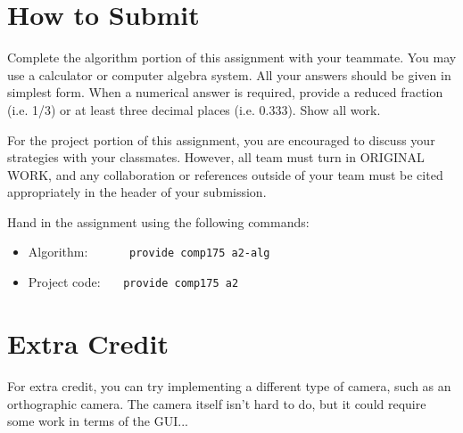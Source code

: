 \documentclass[10pt,twocolumn]{article}
\begin{document}
\section{How to Submit}					
Complete the algorithm portion of this assignment with your teammate. You may use a calculator or computer algebra system. All your answers should be given in simplest form. When a numerical answer is required, provide a reduced fraction (i.e. 1/3) or at least three decimal places (i.e. 0.333).  Show all work.


For the project portion of this assignment, you are encouraged to discuss your strategies with your classmates. However, all team must turn in ORIGINAL WORK, and any collaboration or references outside of your team must be cited appropriately in the header of your submission.

Hand in the assignment using the following commands:
\begin{itemize}
\item Algorithm:  \ \ \ \ \ \ {\tt provide comp175 a2-alg}
\item Project code: \ \ \ {\tt provide comp175 a2}
\end{itemize}


\section{Extra Credit}
For extra credit, you can try implementing a different type of camera, such as an orthographic camera. The camera itself isn't hard to do, but it could require some work in terms of the GUI...
\end{document}

